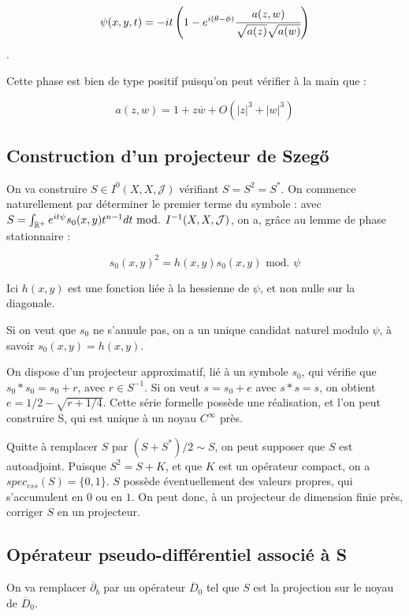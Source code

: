 \begin{equation*}
	\psi(x,y,t) = -it\left(1-e^{i(\theta-\phi)}\cfrac{a(z,w)}{\sqrt{a(z)}\sqrt{a(w)}}\right)
\end{equation*}.

Cette phase est bien de type positif puisqu'on peut vérifier à la main que :

\begin{equation*}
	a(z,w) = 1 + z\overline{w} + O(|z|^3 + |w|^3)
\end{equation*}

\subsection{Construction d'un projecteur de Szeg\H{o}}

On va construire $S \in I^0(X,X,\mathcal{J})$ vérifiant $S =S^2 = S^*$. On commence naturellement par déterminer le premier terme du symbole : avec $S = \int_{\mathbb{R}^+}e^{it\psi}s_0(x,y)t^{n-1}dt \text{ mod. } I^{-1}(X,X,\mathcal{J})$, on a, grâce au lemme de phase stationnaire :

\begin{equation*}
	s_0(x,y)^2= h(x,y)s_0(x,y) \text{ mod. } \psi
\end{equation*}

Ici $h(x,y)$ est une fonction liée à la hessienne de $\psi$, et non nulle sur la diagonale.

Si on veut que $s_0$ ne s'annule pas, on a un unique candidat naturel modulo $\psi$, à savoir $s_0(x,y)= h(x,y)$.

On dispose d'un projecteur approximatif, lié à un symbole $s_0$, qui vérifie que $s_0 * s_0 = s_0 +r$, avec $r \in S^{-1}$. Si on veut $s=s_0 + e$ avec $s * s = s$, on obtient $e = 1/2 - \sqrt{r + 1/4}$. Cette série formelle possède une réalisation, et l'on peut construire S, qui est unique à un noyau $C^{\infty}$ près.

Quitte à remplacer $S$ par $(S+S^*)/2 \sim S$, on peut supposer que $S$ est autoadjoint. Puisque $S^2=S+K$, et que $K$ est un opérateur compact, on a $spec_{ess}(S)=\{0,1\}$. $S$ possède éventuellement des valeurs propres, qui s'accumulent en $0$ ou en $1$. On peut donc, à un projecteur de dimension finie près, corriger $S$ en un projecteur.

\subsection{Opérateur  pseudo-différentiel associé à S}
On va remplacer $\overline{\partial}_b$ par un opérateur $\overline{D}_0$ tel que $S$ est la projection sur le noyau de $\overline{D}_0$. 

